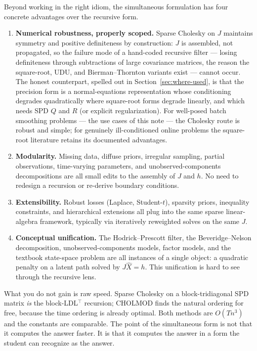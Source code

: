 \documentclass[11pt]{article}
\begin{document}
Beyond working in the right idiom, the simultaneous formulation has
four concrete advantages over the recursive form.
\begin{enumerate}[leftmargin=2em]
\item \textbf{Numerical robustness, properly scoped.}  Sparse Cholesky
  on $J$ maintains symmetry and positive definiteness by construction:
  $J$ is assembled, not propagated, so the failure mode of a hand-coded
  recursive filter --- losing definiteness through subtractions of
  large covariance matrices, the reason the square-root, UDU, and
  Bierman--Thornton variants exist --- cannot occur.  The honest
  counterpart, spelled out in Section~\ref{sec:where-used}, is that the
  precision form is a normal-equations representation whose conditioning
  degrades quadratically where square-root forms degrade linearly, and
  which needs SPD $Q$ and $R$ (or explicit regularization).  For
  well-posed batch smoothing problems --- the use cases of this note ---
  the Cholesky route is robust and simple; for genuinely
  ill-conditioned online problems the square-root literature retains
  its documented advantages.
\item \textbf{Modularity.}  Missing data, diffuse priors, irregular
  sampling, partial observations, time-varying parameters, and
  unobserved-components decompositions are all small edits to the
  assembly of $J$ and $h$.  No need to redesign a recursion or
  re-derive boundary conditions.
\item \textbf{Extensibility.}  Robust losses (Laplace, Student-$t$),
  sparsity priors, inequality constraints, and hierarchical extensions
  all plug into the same sparse linear-algebra framework, typically via
  iteratively reweighted solves on the same $J$.
\item \textbf{Conceptual unification.}  The Hodrick--Prescott filter,
  the Beveridge--Nelson decomposition, unobserved-components models,
  factor models, and the textbook state-space problem are all
  instances of a single object: a quadratic penalty on a latent path
  solved by $J\widehat X=h$.  This unification is hard to see through
  the recursive lens.
\end{enumerate}

What you do not gain is raw speed.  Sparse Cholesky on a
block-tridiagonal SPD matrix \emph{is} the block-LDL$^\top$ recursion;
CHOLMOD finds the natural ordering for free, because the time ordering
is already optimal.  Both methods are $O(Tn^3)$ and the constants are
comparable.  The point of the simultaneous form is not that it computes
the answer faster.  It is that it computes the answer in a form the
student can recognize as the answer.
\end{document}
